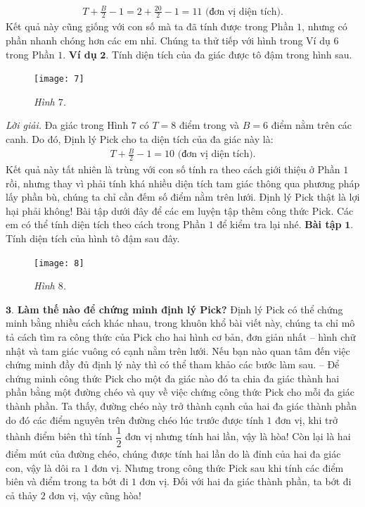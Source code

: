 \begin{multicols}{2}
	\begin{align*}
		T + \frac{B}{2} - 1 = 2 + \frac{20}{2} - 1 = 11 \text{ (đơn vị diện tích)}.
	\end{align*}
	Kết quả này cũng giống với con số mà ta đã tính được trong Phần $1$, nhưng có phần nhanh chóng hơn các em nhỉ.
	\vskip 0.1cm
	Chúng ta thử tiếp với hình trong Ví dụ $6$ trong Phần $1$.
	\vskip 0.1cm
	\textbf{\color{toancuabi}Ví dụ} $\pmb{2.}$ Tính diện tích của đa giác được tô đậm trong hình sau.
	\begin{figure}[H]
		\vspace*{-5pt}
		\centering
		\captionsetup{labelformat= empty, justification=centering}
		\texttt{[image: 7]}
		\caption{\small\textit{\color{toancuabi}Hình $7$.}}
		\vspace*{-10pt}
	\end{figure}
	\textit{Lời giải.}	Đa giác trong Hình $7$ có $T = 8$ điểm trong và $B = 6$ điểm nằm trên các canh. Do đó, Định lý Pick cho ta diện tích của đa giác này là:
	\begin{align*}
		T + \frac{B}{2} - 1 = 10 \text{ (đơn vị diện tích).}
	\end{align*}
	Kết quả này tất nhiên là trùng với con số tính ra theo cách giới thiệu ở Phần $1$ rồi, nhưng thay vì phải tính khá nhiều diện tích tam giác thông qua phương pháp lấy phần bù, chúng ta chỉ cần đếm số điểm nằm trên lưới. Định lý Pick thật là lợi hại phải không!
	\vskip 0.1cm
	Bài tập dưới đây để các em luyện tập thêm công thức Pick. Các em có thể tính diện tích theo cách trong Phần $1$ để kiểm tra lại nhé.
	\vskip 0.1cm
	\textbf{\color{toancuabi}Bài tập} $\pmb{1.}$ Tính diện tích của hình tô đậm sau đây.
	\begin{figure}[H]
		\vspace*{-5pt}
		\centering
		\captionsetup{labelformat= empty, justification=centering}
		\texttt{[image: 8]}
		\caption{\small\textit{\color{toancuabi}Hình $8$.}}
		\vspace*{-5pt}
	\end{figure}
	$\pmb{3.}$ \textbf{\color{toancuabi}Làm thế nào để chứng minh định lý Pick?}
	\vskip 0.1cm
	Định lý Pick có thể chứng minh bằng nhiều cách khác nhau, trong khuôn khổ bài viết này, chúng ta chỉ mô tả cách tìm ra công thức của Pick cho hai hình cơ bản, đơn giản nhất -- hình chữ nhật và tam giác vuông có cạnh nằm trên lưới.
	\vskip 0.1cm 
	Nếu bạn nào quan tâm đến việc chứng minh đầy đủ định lý này thì có thể tham khảo các bước làm sau.
	\vskip 0.1cm
	-- Để chứng minh công thức Pick cho một đa giác nào đó ta chia đa giác thành hai phần bằng một đường chéo và quy về việc chứng công thức Pick cho mỗi đa giác thành phần. Ta thấy, đường chéo này trở thành cạnh của hai đa giác thành phần do đó các điểm nguyên trên đường chéo lúc trước được tính $1$ đơn vị, khi trở thành điểm biên thì tính $\dfrac{1}{2}$ đơn vị nhưng tính hai lần, vậy là hòa! Còn lại là hai điểm mút của đường chéo, chúng được tính hai lần do là đỉnh của hai đa giác con, vậy là dôi ra $1$ đơn vị. Nhưng trong công thức Pick sau khi tính các điểm biên và điểm trong ta bớt đi $1$ đơn vị. Đối với hai đa giác thành phần, ta bớt đi cả thảy $2$ đơn vị, vậy cũng hòa! 

\end{multicols}
